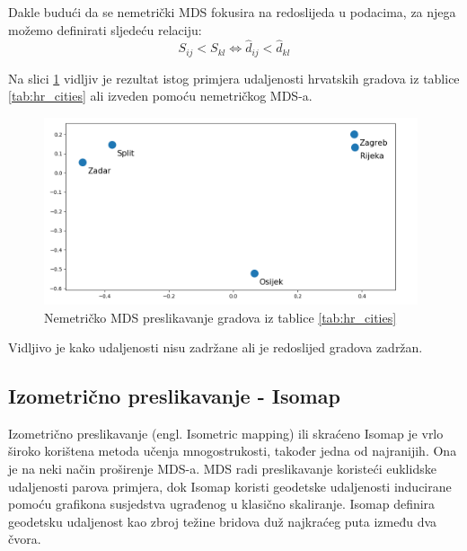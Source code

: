 \documentclass[times, utf8, diplomski]{fer}
\begin{document}
Dakle budući da se nemetrički MDS fokusira na redoslijeda u podacima, za njega možemo definirati sljedeću relaciju:
\begin{equation}
    S_{ij} < S_{kl} \iff \hat{d}_{ij} < \hat{d}_{kl}
\end{equation}

Na slici \ref{fig:mds_mapping_hr_nonmetrc} vidljiv je rezultat istog primjera udaljenosti hrvatskih gradova iz tablice \ref{tab:hr_cities} ali izveden pomoću nemetričkog MDS-a.

\begin{figure}[htb]
    \centering
    \includegraphics[width=11cm]{resources/images/reduction/mds_mapping_hr_nonmetric.png}
    \caption{Nemetričko MDS preslikavanje gradova iz tablice \ref{tab:hr_cities}}
    \label{fig:mds_mapping_hr_nonmetrc}
\end{figure}
Vidljivo je kako udaljenosti nisu zadržane ali je redoslijed gradova zadržan.

\subsection{Izometrično preslikavanje - Isomap}

Izometrično preslikavanje (engl. Isometric mapping) ili skraćeno Isomap je vrlo široko korištena metoda učenja mnogostrukosti, također jedna od najranijih. Ona je na neki način proširenje MDS-a. MDS radi preslikavanje koristeći euklidske udaljenosti parova primjera, dok Isomap koristi geodetske udaljenosti inducirane pomoću grafikona susjedstva ugrađenog u klasično skaliranje. Isomap definira geodetsku udaljenost kao zbroj težine bridova duž najkraćeg puta između dva čvora.
\end{document}
